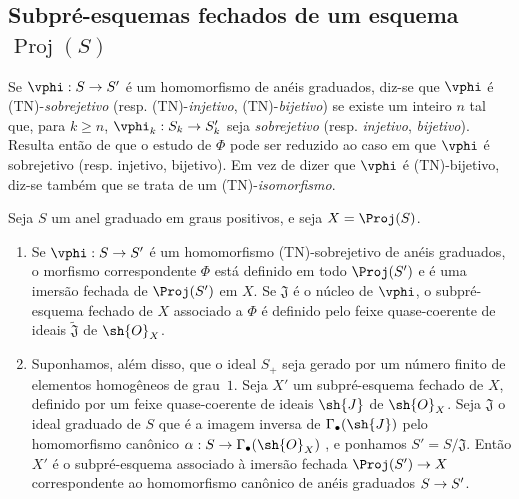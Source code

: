 \documentclass[oneside,10pt]{amsart}
\makeatletter
\renewcommand{\geq}{\geqslant}
\newcommand{\ega@arrow}[2]{\mathchoice{#1}{#2}{#2}{#2}}
\renewcommand{\to}{\ega@arrow{\longrightarrow}{\rightarrow}}
\let\EGAOriginalLabel\label
\renewcommand{\label}[1]{\phantomsection\EGAOriginalLabel{#1}}
\makeatother
\begin{document}
\subsection{Subpré-esquemas fechados de um esquema $\operatorname{Proj}(S)$}
\label{subsection:II.2.9}

\begin{env}[2.9.1]
\label{II.2.9.1}
Se $\vphi:S\to S'$ é um homomorfismo de anéis graduados, diz-se que $\vphi$ é (TN)-\emph{sobrejetivo} (resp. (TN)-\emph{injetivo}, (TN)-\emph{bijetivo}) se existe um inteiro $n$ tal que, para $k\geq n$, $\vphi_k:S_k\to S'_k$ seja \emph{sobrejetivo} (resp. \emph{injetivo}, \emph{bijetivo}).
Resulta então de  que o estudo de $\Phi$ pode ser reduzido ao caso em que $\vphi$ é sobrejetivo (resp. injetivo, bijetivo).
Em vez de dizer que $\vphi$ é (TN)-bijetivo, diz-se também que se trata de um (TN)-\emph{isomorfismo}.
\end{env}

\begin{proposition}[2.9.2]
\label{II.2.9.2}
Seja $S$ um anel graduado em graus positivos, e seja $X=\Proj(S)$.
\begin{enumerate}
  \item[{\rm(i)}] Se $\vphi:S\to S'$ é um homomorfismo (TN)-sobrejetivo de anéis graduados, o morfismo correspondente $\Phi$  está definido em todo $\Proj(S')$ e é uma imersão fechada de $\Proj(S')$ em $X$.
    Se $\mathfrak{J}$ é o núcleo de $\vphi$, o subpré-esquema fechado de $X$ associado a $\Phi$ é definido pelo feixe quase-coerente de ideais $\widetilde{\mathfrak{J}}$ de $\sh{O}_X$.
  \item[{\rm(ii)}] Suponhamos, além disso, que o ideal $S_+$ seja gerado por um número finito de elementos homogêneos de grau~$1$.
    Seja $X'$ um subpré-esquema fechado de $X$, definido por um feixe quase-coerente de ideais $\sh{J}$ de $\sh{O}_X$.
    Seja $\mathfrak{J}$ o ideal graduado de $S$ que é a imagem inversa de $\Gamma_\bullet(\sh{J})$ pelo homomorfismo canônico $\alpha:S\to\Gamma_\bullet(\sh{O}_X)$ , e ponhamos $S'=S/\mathfrak{J}$.
    Então $X'$ é o subpré-esquema associado à imersão fechada $\Proj(S')\to X$ correspondente ao homomorfismo canônico de anéis graduados $S\to S'$.
\end{enumerate}
\end{proposition}
\end{document}
